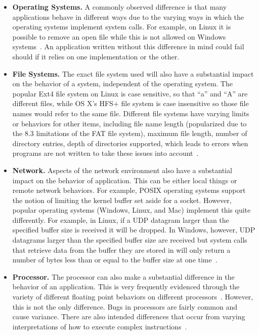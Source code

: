 \begin{itemize}

\item {\bf Operating Systems.}  A commonly observed difference is that many
applications behave in different ways due to the varying ways in which the
operating systems implement system calls.  For example, on Linux it is 
possible to remove an open file while this is 
not allowed on Windows systems~\cite{UnlinkStandard}.  An application written
without this difference in mind could fail should if it relies on one
implementation or the other.

\item {\bf File Systems.}  The exact file system used will also have a
substantial impact on the behavior of a system, independent of the
operating system.  The popular Ext4 file system on Linux is case 
sensitive, so that ``a'' and ``A'' are different files, while OS X's HFS+ file 
system is case insensitive so those file names would refer to the same
file.  Different file systems have varying limits or behaviors for other 
items, including file name length (popularized due to the 8.3 limitations
of the FAT file system), maximum file length, number of directory entries, 
depth of directories supported, which leads to errors when programs are not
written to take these issues into account~\cite{EXT4Layout, AppleHFS}.

\item {\bf Network.}  Aspects of the network environment also have a 
substantial impact on the behavior of application.  This can be either
local things or remote network behaviors.  For example, POSIX operating
systems support the notion of limiting the kernel buffer set aside for a
socket.  
However, popular operating systems (Windows, Linux, and Mac) 
implement this quite differently.  For example, in Linux, if a UDP datagram larger than the
specified buffer size is received it will be dropped.  In Windows, however, UDP
datagrams larger than the specified buffer size are received but system calls
that retrieve data from the buffer they are stored in will only return a number
of bytes less than or equal to the buffer size at one time~\cite{Zhuang_NSDI_2014}.

\item {\bf Processor.}  The processor can also make a substantial
difference in the behavior of an application.  This is very frequently
evidenced through the variety of different floating point behaviors on
different processors~\cite{ArbitraryPrecision}.  However, this is not the only
difference.  Bugs in processors are fairly common and cause variance.
There are also intended differences that occur from varying interpretations
of how to execute complex instructions~\cite{Microarch}.

\end{itemize}

